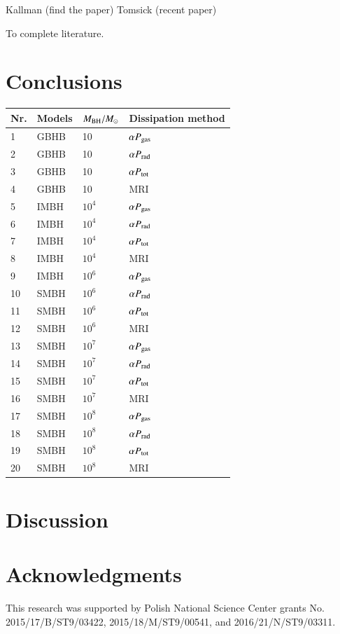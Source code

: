 \documentclass[preprint2]{aastex6}
\begin{document}
Kallman (find the paper)
Tomsick (recent paper) 

To complete literature. 

\section{Conclusions}
\label{sec:results}


\begin{table}
\begin{center}
\begin{tabular}{llll}
\hline 
Nr. & Models & $M_{\rm BH}/M_\odot$ & Dissipation method \\ 
\hline\hline
1 & GBHB & 10  & $\alpha P_{\rm gas}$ \\
2 & GBHB & 10 & $\alpha P_{\rm rad}$\\
3 & GBHB & 10 & $\alpha P_{\rm tot}$\\
4 & GBHB & 10 & MRI \\
5 & IMBH & $10^4$  & $\alpha P_{\rm gas}$ \\
6 & IMBH & $10^4$ & $\alpha P_{\rm rad}$\\
7 & IMBH & $10^4$ & $\alpha P_{\rm tot}$\\
8 & IMBH & $10^4$ & MRI \\
9 & IMBH & $10^6$  & $\alpha P_{\rm gas}$ \\
10 & SMBH & $10^6$ & $\alpha P_{\rm rad}$\\
11 & SMBH & $10^6$ & $\alpha P_{\rm tot}$\\
12 & SMBH & $10^6$ & MRI \\
13 & SMBH & $10^7$  & $\alpha P_{\rm gas}$ \\
14 & SMBH & $10^7$ & $\alpha P_{\rm rad}$\\
15 & SMBH & $10^7$ & $\alpha P_{\rm tot}$\\
16 & SMBH & $10^7$ & MRI \\
17 & SMBH & $10^8$  & $\alpha P_{\rm gas}$ \\
18 & SMBH & $10^8$ & $\alpha P_{\rm rad}$\\
19 & SMBH & $10^8$ & $\alpha P_{\rm tot}$\\
20 & SMBH & $10^8$ & MRI \\
\hline 
\end{tabular}
\end{center}
\end{table}


\section{Discussion}
\label{sec:sum}


\section*{Acknowledgments}

This research was supported by Polish National Science 
Center grants No. 2015/17/B/ST9/03422, 2015/18/M/ST9/00541, and 2016/21/N/ST9/03311.  



\end{document}
